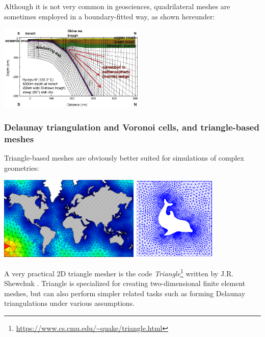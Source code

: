 
Although it is not very common in geosciences, quadrilateral meshes are sometimes 
employed in a boundary-fitted way, as shown hereunder:

\begin{center}
\includegraphics[width=7cm]{images/meshes/gukt16}\\
\end{center}


\subsubsection{Delaunay triangulation and Voronoi cells, and triangle-based meshes}

Triangle-based meshes are obviously better suited for simulations of complex geometries:
\begin{center}
\includegraphics[height=4cm]{images/meshes/tr1}
\includegraphics[height=4cm]{images/meshes/dolfin}
\end{center}

A very practical 2D triangle mesher is the code {\sl Triangle}\footnote{\url{https://www.cs.cmu.edu/~quake/triangle.html}}
written by J.R. Shewchuk \cite{shew96}.
Triangle is specialized for creating two-dimensional finite element meshes, but can also perform simpler related tasks such as forming Delaunay triangulations under various assumptions.

